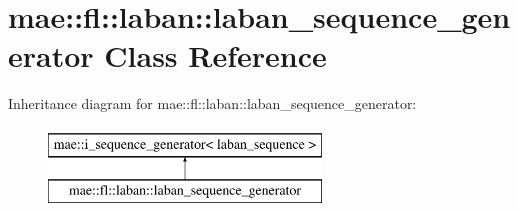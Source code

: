 \hypertarget{classmae_1_1fl_1_1laban_1_1laban__sequence__generator}{\section{mae\-:\-:fl\-:\-:laban\-:\-:laban\-\_\-sequence\-\_\-generator Class Reference}
\label{classmae_1_1fl_1_1laban_1_1laban__sequence__generator}
}
Inheritance diagram for mae\-:\-:fl\-:\-:laban\-:\-:laban\-\_\-sequence\-\_\-generator\-:\begin{figure}[H]
\begin{center}
\leavevmode
\includegraphics[height=2.000000cm]{classmae_1_1fl_1_1laban_1_1laban__sequence__generator}
\end{center}
\end{figure}
